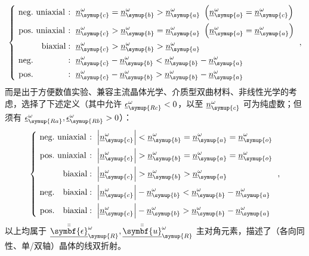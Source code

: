 \begin{equation} \label{eq:2-33}
	\left\{\ \begin{aligned} \text{neg.}&\ \text{uniaxial}\!\!\!\!\!\!&&:\ \underline{n}^{\omega}_{\symup{c}} = \underline{n}^{\omega}_{\symup{b}} > \underline{n}^{\omega}_{\symup{a}}\  \left( \underline{n}^{\omega}_{\symup{o}} = \underline{n}^{\omega}_{\symup{c}} \right) \\ \text{pos.}&\ \text{uniaxial}\!\!\!\!\!\!&&:\ \underline{n}^{\omega}_{\symup{c}} > \underline{n}^{\omega}_{\symup{b}} = \underline{n}^{\omega}_{\symup{a}}\ \left( \underline{n}^{\omega}_{\symup{o}} = \underline{n}^{\omega}_{\symup{a}} \right) \\ &\ \ \ \text{biaxial}\!\!\!\!\!\!&&:\ \underline{n}^{\omega}_{\symup{c}} > \underline{n}^{\omega}_{\symup{b}} > \underline{n}^{\omega}_{\symup{a}} \\ \text{neg.}&\ \ \ \!\!\!\!\!\!&&:\ \underline{n}^{\omega}_{\symup{c}} - \underline{n}^{\omega}_{\symup{b}} < \underline{n}^{\omega}_{\symup{b}} - \underline{n}^{\omega}_{\symup{a}} \\ \text{pos.}&\ \ \ \!\!\!\!\!\!&&:\ \underline{n}^{\omega}_{\symup{c}} - \underline{n}^{\omega}_{\symup{b}} > \underline{n}^{\omega}_{\symup{b}} - \underline{n}^{\omega}_{\symup{a}} \end{aligned}\right. ~,
\end{equation}
而是出于方便数值实验、兼容主流晶体光学、介质型双曲材料、非线性光学的考虑，选择了下述定义（其中允许 $\underline{\epsilon}^{\omega}_{\symup{Rc}} < 0$，以至 $\underline{n}^{\omega}_{\symup{c}}$ 可为纯虚数；但须有 $\underline{\epsilon}^{\omega}_{\symup{Ra}},\underline{\epsilon}^{\omega}_{\symup{Rb}} > 0$）：
\begin{equation} \label{eq:2-34}
	\left\{\ \begin{aligned} \text{neg.}&\ \text{uniaxial}\!\!\!\!\!\!&&:\ \left| \underline{n}^{\omega}_{\symup{c}} \right| < \underline{n}^{\omega}_{\symup{b}} = \underline{n}^{\omega}_{\symup{a}} = \underline{n}^{\omega}_{\symup{o}} \\ \text{pos.}&\ \text{uniaxial}\!\!\!\!\!\!&&:\ \left| \underline{n}^{\omega}_{\symup{c}} \right| > \underline{n}^{\omega}_{\symup{b}} = \underline{n}^{\omega}_{\symup{a}} = \underline{n}^{\omega}_{\symup{o}} \\ &\ \ \ \text{biaxial}\!\!\!\!\!\!&&:\ \left| \underline{n}^{\omega}_{\symup{c}} \right| > \underline{n}^{\omega}_{\symup{b}} > \underline{n}^{\omega}_{\symup{a}} \\ \text{neg.}&\ \ \ \text{biaxial}\!\!\!\!\!\!&&:\ \left| \underline{n}^{\omega}_{\symup{c}} \right| - \underline{n}^{\omega}_{\symup{b}} < \underline{n}^{\omega}_{\symup{b}} - \underline{n}^{\omega}_{\symup{a}} \\ \text{pos.}&\ \ \ \text{biaxial}\!\!\!\!\!\!&&:\ \left| \underline{n}^{\omega}_{\symup{c}} \right| - \underline{n}^{\omega}_{\symup{b}} > \underline{n}^{\omega}_{\symup{b}} - \underline{n}^{\omega}_{\symup{a}} \end{aligned}\right. ~,
\end{equation}
以上均属于 $\bar{\bar{\underline{\symbf{\epsilon}}}}_{\symup{R}}^{\omega}, \bar{\bar{\underline{\symbf{u}}}}_{\symup{R}}^{\omega}$ 主对角元素，描述了（各向同性、单/双轴）晶体的线双折射。

